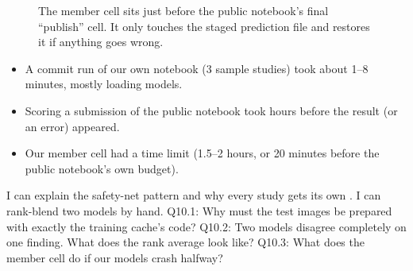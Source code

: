 \begin{figure}[H]
\centering
{}
\caption{The member cell sits just before the public notebook's final ``publish'' cell. It only touches the staged
prediction file and restores it if anything goes wrong.}
\label{fig:member}
\end{figure}

\begin{innumbers}
\begin{itemize}
\item A commit run of our own notebook (3 sample studies) took about 1--8 minutes, mostly loading models.
\item Scoring a submission of the public notebook took  hours before the result (or an error) appeared.
\item Our member cell had a time limit (1.5--2 hours, or 20 minutes before the public notebook's own budget).
\end{itemize}
\end{innumbers}

\begin{checkpoint}
\begin{itemize}
\done I can explain the safety-net pattern and why every study gets its own .
\done I can rank-blend two models by hand.
\quiz Q10.1: Why must the test images be prepared with exactly the training cache's code?
\quiz Q10.2: Two models disagree completely on one finding. What does the rank average look like?
\quiz Q10.3: What does the member cell do if our models crash halfway?
\end{itemize}
\end{checkpoint}
